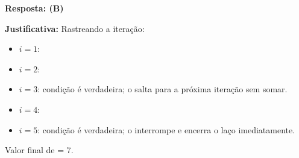\ifmostrarGabarito
\textbf{Resposta: (B)}

\textbf{Justificativa:}
Rastreando a iteração:
\begin{itemize}
    \item $i = 1$: 
    \item $i = 2$: 
    \item $i = 3$: condição  é verdadeira; o  salta para a próxima iteração sem somar.
    \item $i = 4$: 
    \item $i = 5$: condição  é verdadeira; o  interrompe e encerra o laço imediatamente.
\end{itemize}
Valor final de  = 7.

\fi
